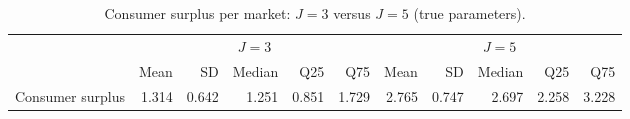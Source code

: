 \begin{table}[H]
\centering\small
\caption{Consumer surplus per market: $J=3$ versus $J=5$ (true parameters).}\label{tab:q6b_cs}
\begin{adjustbox}{max width=\linewidth}
\begin{tabular}{lrrrrrrrrrr}
\toprule
& \multicolumn{5}{c}{$J=3$} & \multicolumn{5}{c}{$J=5$} \\
\cmidrule(lr){2-6} \cmidrule(lr){7-11}
 & Mean & SD & Median & Q25 & Q75 & Mean & SD & Median & Q25 & Q75 \\
\midrule
Consumer surplus & 1.314 & 0.642 & 1.251 & 0.851 & 1.729 & 2.765 & 0.747 & 2.697 & 2.258 & 3.228 \\
\bottomrule
\end{tabular}
\end{adjustbox}
\par\vspace{3pt}{\footnotesize 100 markets per dataset; both datasets use the same $R=500$ consumer draws.}
\end{table}
